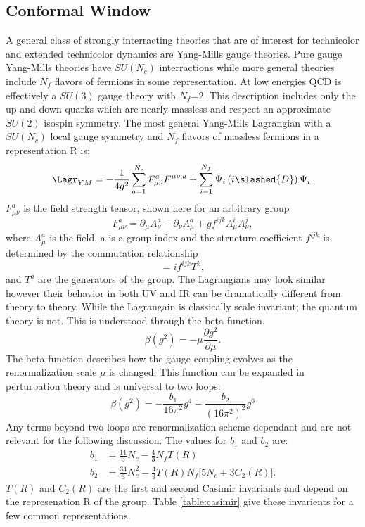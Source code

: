 \subsection{Conformal Window}
\label{sec:sec:conformalwindow}
A general class of strongly interracting theories that are of interest for technicolor and extended technicolor dynamics are Yang-Mills gauge theories.
Pure gauge Yang-Mills theories have $SU(N_c)$ interractions while more general theories include $N_f$ flavors of fermions in some representation.
At low energies QCD is effectively a $SU(3)$ gauge theory with $N_f$=2.
This description includes only the up and down quarks which are nearly massless and respect an approximate $SU(2)$ isospin symmetry.
The most general Yang-Mills Lagrangian with a $SU(N_c)$ local gauge symmetry and $N_f$ flavors of massless fermions in a representation R is:
\begin{equation}
  \Lagr_{YM}=-\frac{1}{4g^2}\sum\limits_{a=1}^{N_c} F^a_{\mu\nu}F^{\mu\nu,a}+\sum\limits_{i=1}^{N_f} \bar\Psi_i\left(i\slashed{D}\right)\Psi_i.  
\end{equation}
$F^a_{\mu\nu}$ is the field strength tensor, shown here for an arbitrary group
\begin{equation}
  F^a_{\mu\nu}=\partial_\mu A^a_\nu-\partial_\nu A^a_\mu + gf^{ijk}A^i_\mu A^j_\nu,
\end{equation}
where $A^a_\mu$ is the field, a is a group index and the structure coefficient $f^{ijk}$ is determined by the commutation relationship
\begin{equation}
  [T^i,T^j]=if^{ijk}T^k,
\end{equation}
and $T^a$ are the generators of the group.
The Lagrangians may look similar however their behavior in both UV and IR can be dramatically different from theory to theory.
While the Lagrangain is classically scale invariant; the quantum theory is not.
This is understood through the beta function,
\begin{equation}
  \beta (g^2)=-\mu\frac{\partial g^2}{\partial \mu}.
\end{equation}
The beta function describes how the gauge coupling evolves as the renormalization scale $\mu$ is changed.
This function can be expanded in perturbation theory and is universal to two loops:
\begin{equation}
  \beta\left(g^2\right)=-\frac{b_1}{16\pi^2}g^4-\frac{b_2}{(16\pi^2)^2}g^6
\end{equation}
Any terms beyond two loops are renormalization scheme dependant and are not relevant for the following discussion.
The values for $b_1$ and $b_2$ are:
\begin{align}
  b_1&=\frac{11}{3}N_c-\frac{4}{3}N_fT(R)\\
  b_2&=\frac{34}{3}N_c^2-\frac{4}{3}T(R)N_f\Big[5N_c+3C_2(R)\Big].
\end{align}
$T(R)$ and $C_2(R)$ are the first and second Casimir invariants and depend on the represenation R of the group.
Table \ref{table:casimir} give these invarients for a few common representations.


